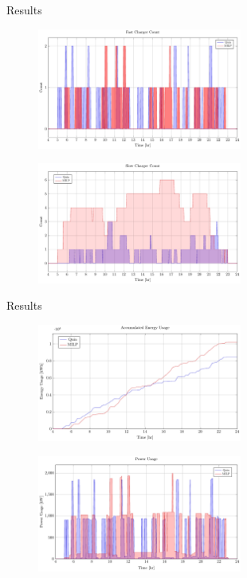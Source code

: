 \documentclass[bigger]{beamer}
\begin{document}
\begin{frame}[label={sec:org33e8cab}]{Results}
\begin{figure}[htpb]
\centering
    \includegraphics[width=0.6\textwidth]{img/charger-count-fast-milp-pap.pdf}
\end{figure}
\begin{figure}[htpb]
\centering
    \includegraphics[width=0.6\textwidth]{img/charger-count-slow-milp-pap.pdf}
\end{figure}
\end{frame}

\begin{frame}[label={sec:orgdbaa326}]{Results}
\begin{figure}[htpb]
\centering
    \includegraphics[width=0.6\textwidth]{img/energy-milp-pap}
\end{figure}
\begin{figure}[htpb]
\centering
    \includegraphics[width=0.6\textwidth]{img/power-milp-pap}
\end{figure}
\end{frame}
\end{document}
